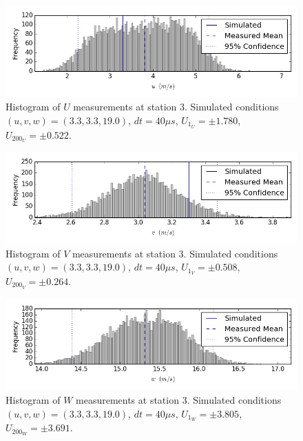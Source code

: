 \begin{figure}[H]
\centering
\includegraphics[width=6in]{figs/Ely_May28th03002/uncertainty_Ely_May28th03002_U}
\caption{Histogram of $U$ measurements at station 3. Simulated conditions 
$(u,v,w)=(3.3, 3.3, 19.0)$, $dt=40 \mu s$, $U_{1_{U}}=\pm 1.780$, 
$U_{200_{U}}=\pm 0.522$.}
\label{fig:uncertainty_Ely_May28th03002_U}
\end{figure}


\begin{figure}[H]
\centering
\includegraphics[width=6in]{figs/Ely_May28th03002/uncertainty_Ely_May28th03002_V}
\caption{Histogram of $V$ measurements at station 3. Simulated conditions 
$(u,v,w)=(3.3, 3.3, 19.0)$, $dt=40 \mu s$, $U_{1_{V}}=\pm 0.508$, 
$U_{200_{V}}=\pm 0.264$.}
\label{fig:uncertainty_Ely_May28th03002_V}
\end{figure}


\begin{figure}[H]
\centering
\includegraphics[width=6in]{figs/Ely_May28th03002/uncertainty_Ely_May28th03002_W}
\caption{Histogram of $W$ measurements at station 3. Simulated conditions 
$(u,v,w)=(3.3, 3.3, 19.0)$, $dt=40 \mu s$, $U_{1_{W}}=\pm 3.805$, 
$U_{200_{W}}=\pm 3.691$.}
\label{fig:uncertainty_Ely_May28th03002_W}
\end{figure}


